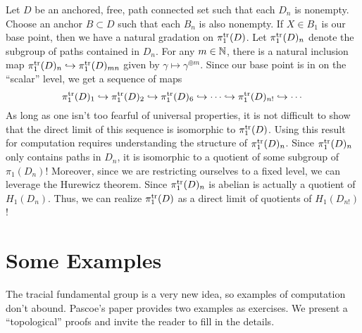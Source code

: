 Let \(D\) be an anchored, free, path connected set such that each \(D_n\) is
nonempty. Choose an anchor \(B \subset D\) such that each \(B_n\) is also
nonempty. If \(X \in B_1\) is our base point, then we have a natural gradation
on \(\pi_1^{\operatorname{tr}}(D)\). Let \(\pi_1^{\operatorname{tr}}(D)_n\) denote the subgroup of paths
contained in \(D_n\). For any \(m \in \mathbb{N} \), there is a natural inclusion map
\(\pi_1^{\operatorname{tr}}(D)_n \hookrightarrow \pi_1^{\operatorname{tr}}(D)_{mn}\) given by
\(\gamma\mapsto \gamma^{\oplus m}\). Since our base point is in on the
``scalar'' level, we get a sequence of maps
\[
  \pi_1^{\operatorname{tr}}(D)_1 \hookrightarrow
  \pi_1^{\operatorname{tr}}(D)_2 \hookrightarrow
  \pi_1^{\operatorname{tr}}(D)_6 \hookrightarrow \cdots \hookrightarrow
  \pi_1^{\operatorname{tr}}(D)_{n!} \hookrightarrow \cdots
\]
As long as one isn't too fearful of universal properties, it is not difficult to
show that the direct limit of this sequence is isomorphic to \(\pi_1^{\operatorname{tr}}(D)\).
Using this result for computation requires understanding the structure of
\(\pi_1^{\operatorname{tr}}(D)_n\). Since \(\pi_1^{\operatorname{tr}}(D)_n\) only contains paths in \(D_n\),
it is isomorphic to a quotient of some subgroup of \(\pi_1(D_n)\)! Moreover,
since we are restricting ourselves to a fixed level, we can leverage the
Hurewicz theorem. Since \(\pi_1^{\operatorname{tr}}(D)_n\) is abelian is actually a quotient
of \(H_1(D_n)\). Thus, we can realize \(\pi_1^{\operatorname{tr}}(D)\) as a direct limit of
quotients of \(H_1(D_{n!})\)!

\section{Some Examples}%
\label{sec:examples}

The tracial fundamental group is a very new idea, so examples of computation
don't abound. Pascoe's paper provides two examples as exercises. We present a
``topological'' proofs and invite the reader to fill in the details.

